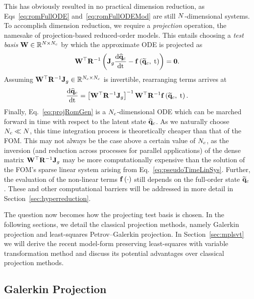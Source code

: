 This has obviously resulted in no practical dimension reduction, as Eqs~\ref{eq:romFullODE} and~\ref{eq:romFullODEMod} are still $N$-dimensional systems. To accomplish dimension reduction, we require a \textit{projection} operation, the namesake of projection-based reduced-order models. This entails choosing a \textit{test basis} $\testBasis \inRTwo{\numDOF}{\numConsModes}$ by which the approximate ODE is projected as
%
\begin{equation}\label{eq:contRomRes}
    \testBasis^\top \resScaleInv \left(\jacobDecode \ode{\consVecCoef}{\timeVar} - \rhsFunc{\consVecRom, \; \timeVar} \right) = \zeroVec.
\end{equation}
%
Assuming $\testBasis^\top \resScaleInv \jacobDecode \inRTwo{\numConsModes}{\numConsModes}$ is invertible, rearranging terms arrives at
%
\begin{equation}\label{eq:projRomGen}
    \ode{\consVecCoef}{\timeVar} = \left[\testBasis^\top \resScaleInv \jacobDecode\right]^{-1} \testBasis^\top \resScaleInv \rhsFunc{\consVecRom, \; \timeVar}.
\end{equation}
%
Finally, Eq.~\ref{eq:projRomGen} is a $N_c$-dimensional ODE which can be marched forward in time with respect to the latent state $\mathbf{\widehat{q}}_{c}$. As we naturally choose $N_c \ll N$, this time integration process is theoretically cheaper than that of the FOM. This may not always be the case above a certain value of $N_c$, as the inversion (and reduction across processes for parallel applications) of the dense matrix $\testBasis^\top \resScaleInv \jacobDecode$ may be more computationally expensive than the solution of the FOM's sparse linear system arising from Eq.~\ref{eq:pseudoTimeLinSys}. Further, the evaluation of the non-linear terms $\mathbf{f} \left(\cdot\right)$ still depends on the full-order state $\mathbf{\widetilde{q}}_{c}$. These and other computational barriers will be addressed in more detail in Section~\ref{sec:hyperreduction}.

The question now becomes how the projecting test basis is chosen. In the following sections, we detail the classical projection methods, namely Galerkin projection and least-squares Petrov--Galerkin projection. In Section~\ref{sec:mplsvt} we will derive the recent model-form preserving least-squares with variable transformation method and discuss its potential advantages over classical projection methods.

\subsection{Galerkin Projection}

